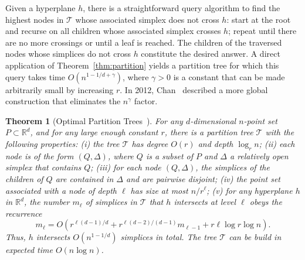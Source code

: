 \documentclass[a4paper,11pt]{paper}
\newcommand{\mathset}[1]{\ensuremath {\mathbb {#1}}}
\newcommand{\R}{\mathset{R}}
\newtheorem{theorem} {Theorem}[section]
\begin{document}
Given a hyperplane $h$, there is a straightforward query
algorithm to find the highest nodes in $\mathcal{T}$ whose
associated simplex does not cross $h$: start at the root and
recurse on all children whose associated simplex crosses $h$;
repeat until there are no more crossings or until a leaf is reached.
The children of the traversed nodes whose simplices do not cross
$h$ constitute the desired answer. A direct application of
Theorem~\ref{thm:partition} yields a partition tree for which this
query takes time $O(n^{1-1/d+\gamma})$, where $\gamma > 0$ is
a constant that can be made arbitrarily small by increasing $r$.
In 2012, Chan~\cite{Chan12} described a more global
construction that eliminates the $n^\gamma$ factor.

\begin{theorem}[Optimal Partition
   Trees~\cite{Chan12}]\label{thm:optpartition}
  For any $d$-dimensional $n$-point set $P \subset \R^d$,
  and for any large enough constant $r$,
  there is a \emph{partition tree} $\mathcal{T}$ with the following
  properties:
   (i) the tree $\mathcal{T}$ has degree $O(r)$ and depth $\log_r n$;
    (ii) each node is of the form $(Q, \Delta)$,
     where $Q$ is a subset of $P$ and $\Delta$ a relatively open
     simplex that contains $Q$; (iii) for each node $(Q, \Delta)$,
     the simplices of the children of $Q$ are contained in $\Delta$
     and are pairwise disjoint; (iv) the point set associated
     with a node of depth $\ell$ has size at most $n/r^\ell$;
     (v) for any hyperplane $h$ in $\R^d$, the number
     $m_\ell$ of simplices in $\mathcal{T}$  that
     $h$ intersects at level $\ell$ obeys the recurrence
     \[
       m_\ell = O(r^{\ell(d-1)/d} + r^{\ell(d-2)/(d-1)}m_{\ell - 1}
         + r\ell \log r \log n).
     \]
   Thus, $h$ intersects $O(n^{1-1/d})$ simplices in total.
 The tree $\mathcal{T}$ can be build in expected time $O(n\log n)$.
\end{theorem}
\end{document}

